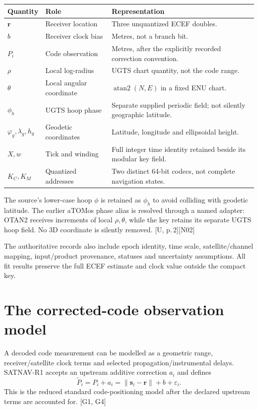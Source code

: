 \documentclass[11pt,a4paper]{article}
\newcommand{\src}[1]{\textcolor{muted}{[U, #1]}}
\newcommand{\ext}[1]{\textcolor{muted}{[#1]}}
\newcommand{\dec}[1]{\textcolor{accent}{[N#1]}}
\begin{document}
\par\small
\begin{tabularx}{\textwidth}{@{}P{.22\textwidth}P{.30\textwidth}Y@{}}\toprule
\textbf{Quantity} & \textbf{Role} & \textbf{Representation}\\\midrule
$\boldsymbol r$ & Receiver location & Three unquantized ECEF doubles.\\
$b$ & Receiver clock bias & Metres, not a branch bit.\\
$P_i$ & Code observation & Metres, after the explicitly recorded correction convention.\\
$\rho$ & Local log-radius & UGTS chart quantity, not the code range.\\
$\theta$ & Local angular coordinate & $\operatorname{atan2}(N,E)$ in a fixed ENU chart.\\
$\phi_h$ & UGTS hoop phase & Separate supplied periodic field; not silently geographic latitude.\\
$\varphi_g,\lambda_g,h_g$ & Geodetic coordinates & Latitude, longitude and ellipsoidal height.\\
$X,w$ & Tick and winding & Full integer time identity retained beside its modular key field.\\
$K_C,K_M$ & Quantized addresses & Two distinct 64-bit codecs, not complete navigation states.\\\bottomrule
\end{tabularx}
\par\normalsize

The source's lower-case hoop $\phi$ is retained as $\phi_h$ to avoid colliding with
geodetic latitude. The earlier aTOMos phase alias is resolved through a named adapter:
OTAN2 receives increments of local $\rho,\theta$, while the key retains its separate
UGTS hoop field. No 3D coordinate is silently removed. \src{p.\,2}\dec{02}

The authoritative records also include epoch identity, time scale, satellite/channel
mapping, input/product provenance, statuses and uncertainty assumptions. All fit
results preserve the full ECEF estimate and clock value outside the compact key.
\clearpage

\section{The corrected-code observation model}
A decoded code measurement can be modelled as a geometric range, receiver/satellite
clock terms and selected propagation/instrumental delays. SATNAV-R1 accepts an
upstream additive correction $a_i$ and defines
\begin{equation}
\widetilde P_i=P_i+a_i=\|\boldsymbol s_i-\boldsymbol r\|+b+\varepsilon_i.
\end{equation}
This is the reduced standard code-positioning model after the declared upstream
terms are accounted for. \ext{G1, G4}
\end{document}
